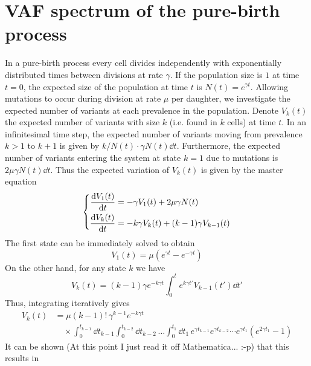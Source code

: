 \documentclass[pdftex,12pt,a4paper]{scrartcl}
\begin{document}
\section{VAF spectrum of the pure-birth process}
In a pure-birth process every cell divides independently with exponentially distributed times between divisions at rate $\gamma$. If the population size is $1$ at time $t=0$, the expected size of the population at time $t$ is $N(t) = e^{\gamma t}$. Allowing mutations to occur during division at rate $\mu$ per daughter, we investigate the expected number of variants at each prevalence in the population. Denote $V_k(t)$ the expected number of variants with size $k$ (i.e. found in $k$ cells) at time $t$. In an infinitesimal time step, the expected number of variants moving from prevalence $k > 1$ to $k+1$ is given by $k/N(t) \cdot \gamma N(t) \dd{t}$. Furthermore, the expected number of variants entering the system at state $k=1$ due to mutations is $2\mu \gamma N(t) \dd{t}$. Thus the expected variation of $V_k(t)$ is given by the master equation
\begin{equation}
    \left\lbrace
    \begin{aligned}
        \dv{V_1(t)}{t} &= - \gamma V_1(t) + 2\mu \gamma N(t) \\
        \dv{V_k(t)}{t} &= -k \gamma V_k(t) + (k-1) \gamma V_{k-1}(t)
    \end{aligned}
    \right.
\end{equation}
The first state can be immediately solved to obtain
\begin{equation}
    V_{1}(t) = \mu ( e^{\gamma t} - e^{-\gamma t} )
\end{equation}
On the other hand, for any state $k$ we have
\begin{equation}
    V_k(t) = (k-1) \gamma e^{-k \gamma t} \int_0^t e^{k \gamma t'} V_{k-1}(t') \dd{t'}
\end{equation}
Thus, integrating iteratively gives
\begin{equation}
    \begin{aligned}
        V_k(t) &= \mu (k-1)! \, \gamma^{k-1} e^{-k \gamma t} \\
        & \quad \times \int_{0}^{t_{k-1}} \! \dd{t_{k-1}} \int_{0}^{t_{k-2}} \! \dd{t_{k-2}} \, \dots \int_{0}^{t_1} \! \dd{t_1} \, e^{\gamma t_{k-1}} e^{\gamma t_{k-2}} \cdots e^{\gamma t_{1}} (e^{2\gamma t_1}-1)        
    \end{aligned}
\end{equation}
It can be shown (At this point I just read it off Mathematica... :-p) that this results in
\end{document}

